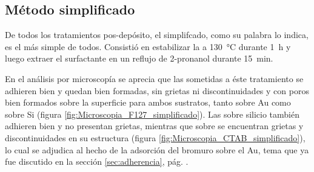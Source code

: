 	
	 \subsection{Método simplificado}

		 	De todos los tratamientos pos-depósito, el simplifcado, como su palabra lo indica, es el más simple de todos. Consistió en estabilizar la \pdm a \SI{130}{\celsius} durante \SI{1}{\hour} y luego extraer el surfactante en un reflujo de 2-pronanol durante \SI{15}{\minute}. 
			
			En el análisis por microscopía se aprecia que las \pdmF\space sometidas a éste tratamiento se adhieren bien y quedan bien formadas, sin grietas ni discontinuidades y con poros bien formados sobre la superficie para ambos sustratos, tanto sobre Au como sobre Si (figura \ref{fig:Microscopia_F127_simplificado}). Las \pdmC\space sobre silicio también adhieren bien y no presentan grietas, mientras que sobre se encuentran grietas y discontinuidades en su estructura (figura \ref{fig:Microscopia_CTAB_simplificado}), lo cual se adjudica al hecho de la adsorción del bromuro sobre el Au, tema que ya fue discutido en la sección \ref{sec:adherencia}, pág. \pageref{sec:adherencia}. 
			
